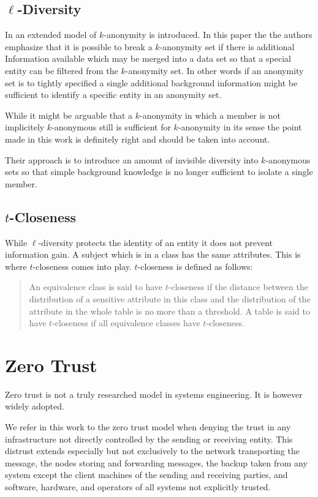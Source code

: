 \subsection{$\ell$-Diversity}
In \cite{machanavajjhala2007diversity} an extended model of $k$-anonymity is introduced. In this paper the the authors emphasize that it is possible to break a $k$-anonymity set if there is additional Information available which may be merged into a data set so that a special entity can be filtered from the $k$-anonymity set. In other words if an anonymity set is to tightly specified a single additional background information might be sufficient to identify a specific entity in an anonymity set.

While it might be arguable that a $k$-anonymity in which a member is not implicitely $k$-anonymous still is sufficient for $k$-anonymity in its sense the point made in this work is definitely right and should be taken into account.

Their approach is to introduce an amount of invisible diversity into $k$-anonymous sets so that simple background knowledge is no longer sufficient to isolate a single member.

\subsection{$t$-Closeness}
While $\ell$-diversity protects the identity of an entity it does not prevent information gain. A subject which is in a class has the same attributes. This is where $t$-closeness\cite{li2007t} comes into play. $t$-closeness is defined as follows:

\begin{quote}
	An equivalence class is said to have $t$-closeness if the distance between the distribution of a sensitive attribute in this class and the distribution of the attribute in the whole table is no more than a threshold. A table is said to have $t$-closeness if all equivalence classes have $t$-closeness.
\end{quote}

\section{Zero Trust}
Zero trust is not a truly researched model in systems engineering. It is however widely adopted. 

We refer in this work to the zero trust model when denying the trust in any infrastructure not directly controlled by the sending or receiving entity. This distrust extends especially but not exclusively to the network transporting the message, the nodes storing and forwarding messages, the backup taken from any system except the client machines of the sending and receiving parties, and software, hardware, and operators of all systems not explicitly trusted.

